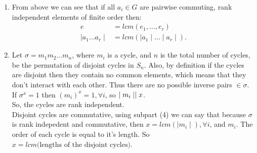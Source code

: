 \documentclass[12pt]{article}
\begin{document}
\begin{solution}
\begin{enumerate}
        
        
        Let $e_i, 1\leq i \leq r$ be orders of elements from $a_1$ to $a_r$ and let $n = a_1\ldots a_r$. 
        F
        Also, we know that $a_i^{e_i} = a_i^{be_i} = 1, b \in \Z^+$ so, 
        \[e = e_1\ldots e_r\]
        \[n^e = (a_1\ldots a_r)^e = 1\]

        for all unique $e_i$ because for any $\mid a_i \mid = \mid a_j \mid = e_i, (a_ia_j)^{e_i} = a_i^{e_i}a_j^{e_i} = 1$. Essentially, $e$ is the lcm of $e_1, \ldots, e_r$. 
        
        Also, given that $a_1\ldots a_r$ are not necessarily rank independent there might exist, for some $a_i$ or combination of $a_i$s, an inverse in $a_1\ldots a_r$. Such that for some $a_i, a_j \in n, a_ia_j = 1$ (and their relative positions don't matter because the group is abelian). 

        \item From above we can see that if all $a_i \in G$ are pairwise commuting, rank independent elements of finite order then: 
        \begin{align*}
            e & = lcm(e_1, \ldots, e_r) \\ 
            \mid a_1 \ldots a_r \mid &= lcm (\mid a_1\mid \ldots \mid a_r \mid). 
        \end{align*}

        \item Let $\sigma = m_1m_2\ldots m_n$, where $m_i$ is a cycle, and $n$ is the total number of cycles, be the permutation of disjoint cycles in $S_n.$ Also, by definition if the cycles are disjoint then they contain no common elements, which means that they don't interact with each other. Thus there are no possible inverse pairs $\in \sigma$. If  $\sigma^x = 1$ then $(m_i)^x = 1, \forall i$, so $\mid m_i \mid \large \mid x$. \\
        So, the cycles are rank independent.  \\ 
        Disjoint cycles are commutative, using subpart (4) we can say that because $\sigma$ is rank indepedent and commutative, then $x = lcm (\mid m_i\mid), \forall i$, and $m_i$. The order of each cycle is equal to it's length. So $x = lcm(\text{lengths of the disjoint cycles)}.$
        \[\]

        
    \end{enumerate}
\end{solution}
\end{document}
